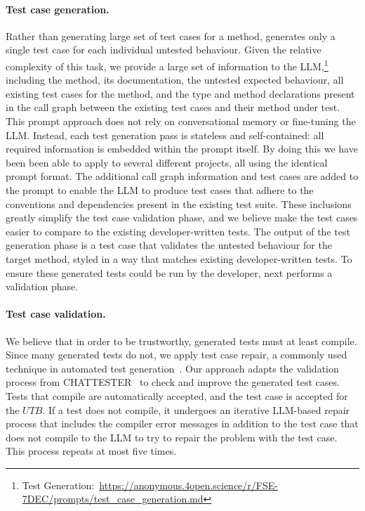 \paragraph{Test case generation.}
Rather than generating large set of test cases for a method, \toolname generates only a single test case for each individual untested behaviour.
Given the relative complexity of this task, we provide a large set of information to the LLM,\footnote{Test Generation:~\url{https://anonymous.4open.science/r/FSE-7DEC/prompts/test_case_generation.md}} including the method, its documentation, the untested expected behaviour, all existing test cases for the method, and the type and method declarations present in the call graph between the existing test cases and their method under test.
This prompt approach does not rely on conversational memory or fine-tuning the LLM. Instead, each test generation pass is stateless and self-contained: all required information is embedded within the prompt itself. 
By doing this we have been been able to apply \toolname to several different projects, all using the identical prompt format.
%
The additional call graph information and test cases are added to the prompt to enable the LLM to produce test cases that adhere to the conventions and dependencies present in the existing test suite.
These inclusions greatly simplify the test case validation phase, and we believe make the test cases easier to compare to the existing developer-written tests.
%
The output of the test generation phase is a test case that validates the untested behaviour for the target method, styled in a way that matches existing developer-written tests.
To ensure these generated tests could be run by the developer, \toolname next performs a validation phase.

\paragraph{Test case validation.}

We believe that in order to be trustworthy, generated tests must at least compile.
Since many generated tests do not, we apply test case repair, a commonly used technique in automated test generation~\cite{xue2024exploring}. Our approach adapts the validation process from CHATTESTER~\cite{yuan2023no} to check and improve the generated test cases.
Tests that compile are automatically accepted, and the test case is accepted for the $UTB$.
If a test does not compile, it undergoes an iterative LLM-based repair process that includes the compiler error messages in addition to the test case that does not compile to the LLM to try to repair the problem with the test case.
This process repeats at most five times.

